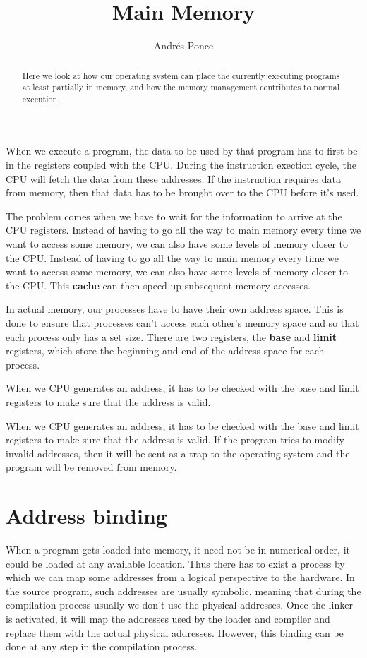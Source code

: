 \documentclass{tufte-handout}
\author{Andr\'es Ponce}
\title{Main Memory}
\begin{document}
\begin{abstract}
Here we look at how our operating system can place the currently executing programs
at least partially in memory, and how the memory management contributes to 
normal execution.
\end{abstract}

When we execute a program, the data to be used by that program has to first be in the
registers coupled with the CPU. During the instruction exection cycle, the CPU
will fetch the data from these addresses. If the instruction requires data from 
memory, then that data has to be brought over to the CPU before it's used.

The problem comes when we have to wait for the information to arrive at 
the CPU registers. Instead of having to go all the way to main memory every time 
we want to access some memory, we can also have some levels of memory closer to the 
CPU. Instead of having to go all the way to main memory every time 
we want to access some memory, we can also have some levels of memory closer to the 
CPU. This \textbf{cache} can then speed up subsequent memory accesses.

In actual memory, our processes have to have their own address space. This is done 
to ensure that processes can't access each other's memory space and so that 
each process only has a set size. There are two registers, the \textbf{base} and
\textbf{limit} registers, which store the beginning and end of the address space for 
each process. 

When we CPU generates an address, it has to be checked with the base and limit 
registers to make sure that the address is valid.

When we CPU generates an address, it has to be checked with the base and limit 
registers to make sure that the address is valid. If the program tries to modify 
invalid addresses, then it will be sent as a trap to the operating system and 
the program will be removed from memory.

\section{Address binding}

When a program gets loaded into memory, it need not be in numerical order, it could 
be loaded at any available location. Thus there has to exist a process by which
we can map some addresses from a logical perspective to the hardware. In the source
program, such addresses are usually symbolic, meaning that during the compilation process
usually we don't use the physical addresses. Once the linker is activated, it will 
map the addresses used by the loader and compiler and replace them with the actual 
physical addresses. However, this binding can be done at any step in the compilation
process. 
\end{document}
